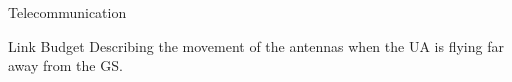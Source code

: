 \begin{frame}{Telecommunication}
  \begin{block}{Link Budget}
      Describing the movement of the antennas when the UA is flying far away from the GS. 
    \end{block}

  \begin{figure}[H]
    \centerline{
    }
  \end{figure}
\end{frame}


